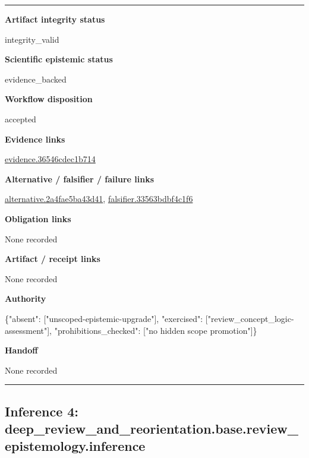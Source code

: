 \documentclass[10pt,a4paper]{article}
\newcommand{\TraceField}[2]{\par\noindent\textbf{#1}\par\noindent #2\par\smallskip}
\newenvironment{TraceDossier}{\par\medskip\noindent\hrule\medskip}{\medskip\hrule\par\medskip}
\begin{document}
\begin{TraceDossier}
\TraceField{Artifact integrity status}{integrity\_\allowbreak{}valid}

\TraceField{Scientific epistemic status}{evidence\_\allowbreak{}backed}

\TraceField{Workflow disposition}{accepted}

\TraceField{Evidence links}{\hyperlink{trace-evidence-551d4ceaad14f6a575}{evidence.\allowbreak{}36546cdec1\allowbreak{}b714}}

\TraceField{Alternative / falsifier / failure links}{\hyperlink{trace-alternative-c655d0191c7b52ab3c}{alternativ\allowbreak{}e.\allowbreak{}2a4fae5ba4\allowbreak{}3d41}, \hyperlink{trace-alternative-b9252b5e7db6f2d24d}{falsifier.\allowbreak{}33563bdbf4\allowbreak{}c1f6}}

\TraceField{Obligation links}{None recorded}

\TraceField{Artifact / receipt links}{None recorded}

\TraceField{Authority}{\{"absent":\allowbreak{} ["unscoped\allowbreak{}-\allowbreak{}epistemic-\allowbreak{}upgrade"],\allowbreak{} "exercised\allowbreak{}":\allowbreak{} ["review\_\allowbreak{}concept\_\allowbreak{}logic-\allowbreak{}assessment\allowbreak{}"], "prohibiti\allowbreak{}ons\_\allowbreak{}checked":\allowbreak{} ["no hidden scope promotion"\allowbreak{}]\}}

\TraceField{Handoff}{None recorded}

\end{TraceDossier}
\pagebreak[2]\subsection{Inference 4: deep\_\allowbreak{}review\_\allowbreak{}and\_\allowbreak{}reorientat\allowbreak{}ion.\allowbreak{}base.\allowbreak{}review\_\allowbreak{}epistemolo\allowbreak{}gy.\allowbreak{}inference}\label{trace-inference-56060aa96fb85f3643}
\end{document}
